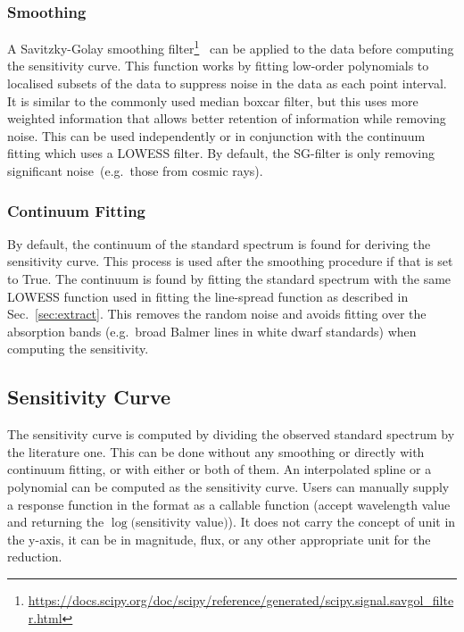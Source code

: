 \documentclass[fleqn,usenatbib]{mnras}
\begin{document}
\subsubsection*{Smoothing}
A Savitzky-Golay smoothing
filter\footnote{\url{https://docs.scipy.org/doc/scipy/reference/generated/scipy.signal.savgol_filter.html}}~\citep[hereafter, SG-filter]{1964AnaCh..36.1627S}
can be applied to the data before computing the sensitivity curve.
This function works by fitting low-order polynomials to localised
subsets of the data to suppress noise in the data as each point
interval. It is similar to the commonly used median boxcar filter,
but this uses more weighted information that allows better
retention of information while removing noise. This can be
used independently or in conjunction with the continuum fitting which
uses a LOWESS filter. By default, the SG-filter is only removing
significant noise~(e.g.\ those from cosmic rays).

\subsubsection*{Continuum Fitting}
By default, the continuum of the standard spectrum is found for
deriving the sensitivity curve. This process is used after the
smoothing procedure if that is set to True. The continuum is found
by fitting the standard spectrum with the same LOWESS function
used in fitting the line-spread function as described in
Sec.~\ref{sec:extract}. This removes the random noise and avoids
fitting over the absorption bands (e.g.\ broad Balmer lines in
white dwarf standards) when computing the sensitivity.

\subsection*{Sensitivity Curve}
The sensitivity curve is computed by dividing the observed standard
spectrum by the literature one. This can be done without any smoothing
or directly with continuum fitting, or with either or both of them.
An interpolated spline or a polynomial can be computed as the
sensitivity curve. Users can manually supply a response function in
the format as a callable function (accept wavelength value and returning the
$\log($sensitivity value$)$). It does not carry the concept of unit in the y-axis,
it can be in magnitude, flux, or any other appropriate unit for the
reduction.
\end{document}
